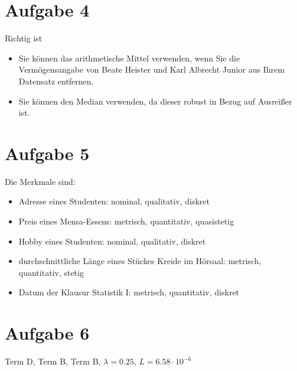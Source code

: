 \documentclass{article}
\begin{document}
	\section*{Aufgabe 4}
	Richtig ist
	\begin{itemize}
		\item Sie können das arithmetische Mittel verwenden, wenn Sie die Vermögensangabe von Beate Heister und Karl Albrecht Junior aus Ihrem Datensatz entfernen.
		\item Sie können den Median verwenden, da dieser robust in Bezug auf Ausreißer ist.
	\end{itemize}

	\section*{Aufgabe 5}
	Die Merkmale sind:
	\begin{itemize}
		\item Adresse eines Studenten: nominal, qualitativ, diskret
		\item Preis eines Mensa-Essens: metrisch, quantitativ, quasistetig
		\item Hobby eines Studenten: nominal, qualitativ, diskret
		\item durchschnittliche Länge eines Stückes Kreide im Hörsaal: metrisch, quantitativ, stetig
		\item Datum der Klausur Statistik I: metrisch, quantitativ, diskret
	\end{itemize}
	
	\section*{Aufgabe 6}
	Term D, Term B, Term B, $\lambda = 0.25$, $L=6.58\cdot 10^{-6}$
	
\end{document}
